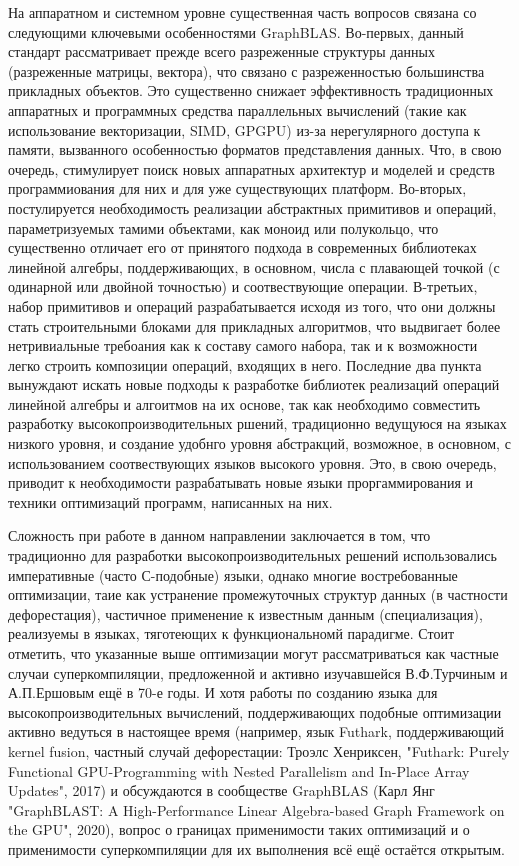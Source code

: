 \documentclass[12pt]{article}  %
\theoremstyle{remark}
\begin{document}
На аппаратном и системном уровне существенная часть вопросов связана со следующими ключевыми особенностями GraphBLAS. Во-первых, данный стандарт рассматривает прежде всего разреженные структуры данных (разреженные матрицы, вектора), что связано с разреженностью большинства прикладных объектов. Это существенно снижает эффективность традиционных аппаратных и программных средства параллельных вычислений (такие как использование векторизации, SIMD, GPGPU) из-за нерегулярного доступа к памяти, вызванного особенностью форматов представления данных. Что, в свою очередь, стимулирует поиск новых аппаратных архитектур и моделей и средств программиования для них и для уже существующих платформ. Во-вторых, постулируется необходимость реализации абстрактных примитивов и операций, параметризуемых тамими объектами, как моноид или полукольцо, что существенно отличает его от принятого подхода в современных библиотеках линейной алгебры, поддерживающих, в основном, числа с плавающей точкой (с одинарной или двойной точностью) и соотвествующие операции. В-третьих, набор примитивов и операций разрабатывается исходя из того, что они должны стать строительными блоками для прикладных алгоритмов, что выдвигает более нетривиальные требоания как к составу самого набора, так и к возможности легко строить композиции операций, входящих в него. Последние два пункта вынуждают искать новые подходы к разработке библиотек реализаций операций линейной алгебры и алгоитмов на их основе, так как необходимо совместить разработку высокопроизводительных ршений, традиционно ведущуюся на языках низкого уровня, и создание удобнго уровня абстракций, возможное, в основном, с использованием соотвествующих языков высокого уровня. Это, в свою очередь, приводит к необходимости разрабатывать новые языки проргаммирования и техники оптимизаций программ, написанных на них. 

Сложность при работе в данном направлении заключается в том, что традиционно для разработки высокопроизводительных решений использовались императивные (часто С-подобные) языки, однако многие востребованные оптимизации, таие как устранение промежуточных структур данных (в частности дефорестация), частичное применение к известным данным (специализация), реализуемы в языках, тяготеющих к функциональномй парадигме. Стоит отметить, что указанные выше оптимизации могут рассматриваться как частные случаи суперкомпиляции, предложенной и активно изучавшейся В.Ф.Турчиным и А.П.Ершовым ещё в 70-е годы. И хотя работы по созданию языка для высокопроизводительных вычислений, поддерживающих подобные оптимизации активно ведуться в настоящее время (например, язык Futhark, поддерживающий kernel fusion, частный случай дефорестации: Троэлс Хенриксен, "Futhark: Purely Functional GPU-Programming with Nested Parallelism and In-Place Array Updates", 2017) и обсуждаются в сообществе GraphBLAS (Карл Янг "GraphBLAST: A High-Performance Linear Algebra-based Graph Framework on the GPU", 2020), вопрос о границах применимости таких оптимизаций и о применимости суперкомпиляции для их выполнения всё ещё остаётся открытым.
\end{document}
